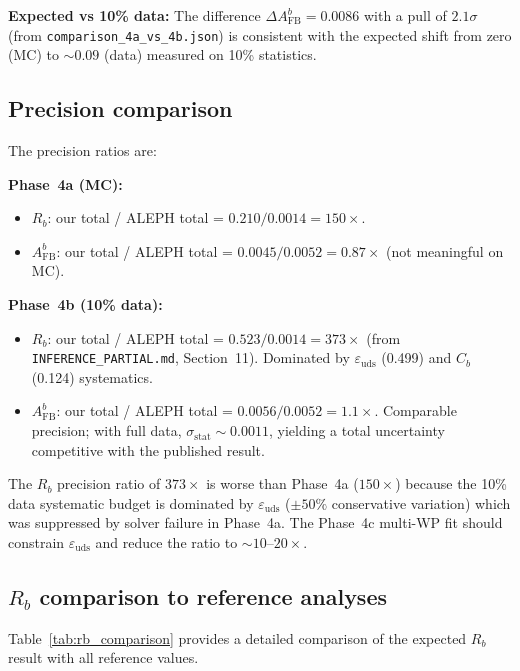 \documentclass[11pt,a4paper]{article}
\begin{document}
\textbf{Expected vs 10\% data:} The difference $\Delta A_\mathrm{FB}^b = 0.0086$ with
a pull of $2.1\sigma$ (from \texttt{comparison\_4a\_vs\_4b.json}) is consistent with
the expected shift from zero (MC) to $\sim 0.09$ (data) measured on 10\% statistics.

\subsection{Precision comparison}
\label{sec:precision_comparison}

The precision ratios are:

\textbf{Phase~4a (MC):}
\begin{itemize}
\item $R_b$: our total / ALEPH total = $0.210/0.0014 = 150\times$.
\item $A_\mathrm{FB}^b$: our total / ALEPH total = $0.0045/0.0052 = 0.87\times$
(not meaningful on MC).
\end{itemize}

\textbf{Phase~4b (10\% data):}
\begin{itemize}
\item $R_b$: our total / ALEPH total = $0.523/0.0014 = 373\times$
(from \texttt{INFERENCE\_PARTIAL.md}, Section~11). Dominated by
$\varepsilon_\mathrm{uds}$ (0.499) and $C_b$ (0.124) systematics.
\item $A_\mathrm{FB}^b$: our total / ALEPH total = $0.0056/0.0052 = 1.1\times$.
Comparable precision; with full data, $\sigma_\mathrm{stat} \sim 0.0011$, yielding
a total uncertainty competitive with the published result.
\end{itemize}

The $R_b$ precision ratio of $373\times$ is worse than Phase~4a ($150\times$) because
the 10\% data systematic budget is dominated by $\varepsilon_\mathrm{uds}$ ($\pm 50\%$
conservative variation) which was suppressed by solver failure in Phase~4a. The
Phase~4c multi-WP fit should constrain $\varepsilon_\mathrm{uds}$ and reduce the ratio
to $\sim 10$--$20\times$.

\subsection{$R_b$ comparison to reference analyses}
\label{sec:rb_comparison_detail}

Table~\ref{tab:rb_comparison} provides a detailed comparison of the expected $R_b$
result with all reference values.
\end{document}
